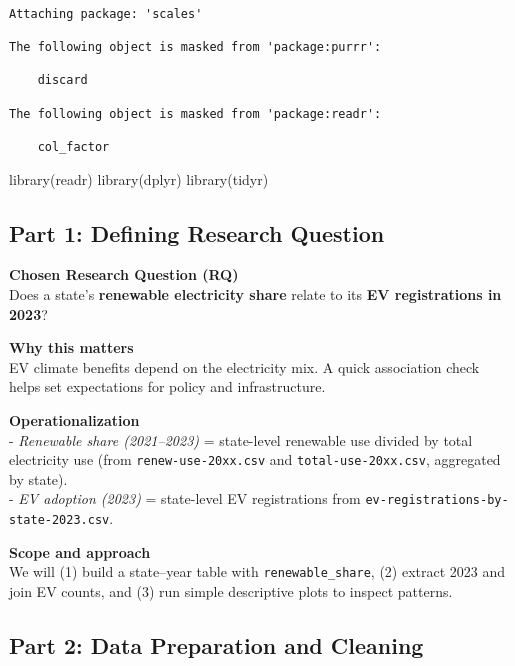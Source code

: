 \documentclass[
  english,
  letterpaper,
  DIV=11,
  numbers=noendperiod]{scrartcl}
\newenvironment{Shaded}{\begin{snugshade}}{\end{snugshade}}
\newcommand{\FunctionTok}[1]{\textcolor[rgb]{0.28,0.35,0.67}{#1}}
\newcommand{\NormalTok}[1]{\textcolor[rgb]{0.00,0.23,0.31}{#1}}
\begin{document}
\begin{verbatim}

Attaching package: 'scales'

The following object is masked from 'package:purrr':

    discard

The following object is masked from 'package:readr':

    col_factor
\end{verbatim}

\begin{Shaded}
\begin{Highlighting}[]
\FunctionTok{library}\NormalTok{(readr)}
\FunctionTok{library}\NormalTok{(dplyr)}
\FunctionTok{library}\NormalTok{(tidyr)}
\end{Highlighting}
\end{Shaded}

\subsection{\texorpdfstring{\textbf{Part 1: Defining Research
Question}}{Part 1: Defining Research Question}}\label{part-1-defining-research-question}

\textbf{Chosen Research Question (RQ)}\\
Does a state's \textbf{renewable electricity share} relate to its
\textbf{EV registrations in 2023}?

\textbf{Why this matters}\\
EV climate benefits depend on the electricity mix. A quick association
check helps set expectations for policy and infrastructure.

\textbf{Operationalization}\\
- \emph{Renewable share (2021--2023)} = state-level renewable use
divided by total electricity use (from \texttt{renew-use-20xx.csv} and
\texttt{total-use-20xx.csv}, aggregated by state).\\
- \emph{EV adoption (2023)} = state-level EV registrations from
\texttt{ev-registrations-by-state-2023.csv}.

\textbf{Scope and approach}\\
We will (1) build a state--year table with \texttt{renewable\_share},
(2) extract 2023 and join EV counts, and (3) run simple descriptive
plots to inspect patterns.

\subsection{\texorpdfstring{\textbf{Part 2: Data Preparation and
Cleaning}}{Part 2: Data Preparation and Cleaning}}\label{part-2-data-preparation-and-cleaning}
\end{document}
